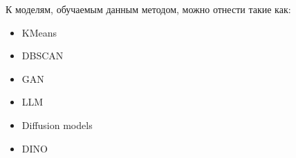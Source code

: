 \documentclass[../part_1.tex]{subfiles}
\begin{document}
    \par К моделям, обучаемым данным методом, можно отнести такие как:
    \begin{itemize}
        \item KMeans\cite{kmeans}
        \item DBSCAN\cite{dbscan_book}
        \item GAN\cite{gan}
        \item LLM\cite{llm}
        \item Diffusion models\cite{song2021scorebasedgenerativemodelingstochastic}
        \item DINO
    \end{itemize}
\end{document}

